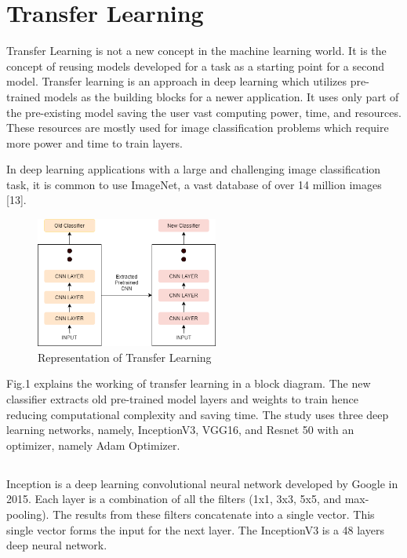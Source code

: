 \documentclass[conference]{IEEEtran}
\begin{document}
\section{Transfer Learning}

Transfer Learning is not a new concept in the machine learning world. It is the concept of reusing models developed for a task as a starting point for a second model. Transfer learning is an approach in deep learning which utilizes pre-trained models as the building blocks for a newer application. It uses only part of the pre-existing model saving the user vast computing power, time, and resources. These resources are mostly used for image classification problems which require more power and time to train layers.

In deep learning applications with a large and challenging image classification task, it is common to use ImageNet, a vast database of over 14 million images [13].


\begin{figure}
\centering
\includegraphics[width=6cm]{2.png}
\caption{ Representation of Transfer Learning}
\label{fig:cenario}
\end{figure}

Fig.1 explains the working of transfer learning in a block diagram. The new classifier extracts old pre-trained model layers and weights to train hence reducing computational complexity and saving time. The study uses three deep learning networks, namely, InceptionV3, VGG16, and Resnet 50 with an optimizer, namely Adam Optimizer.

\subsection{}

Inception is a deep learning convolutional neural network developed by Google in 2015. Each layer is a combination of all the filters (1x1, 3x3, 5x5, and max-pooling). The results from these filters concatenate into a single vector. This single vector forms the input for the next layer. The InceptionV3 is a 48 layers deep neural network.
\end{document}
